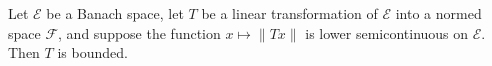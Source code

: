 Let $\mathcal{E}$ be a Banach space, let $T$ be a linear transformation of $\mathcal{E}$ into a normed space $\mathcal{F}$, and suppose the function $x \mapsto \|Tx\|$ is lower semicontinuous on $\mathcal{E}$. Then $T$ is bounded.
